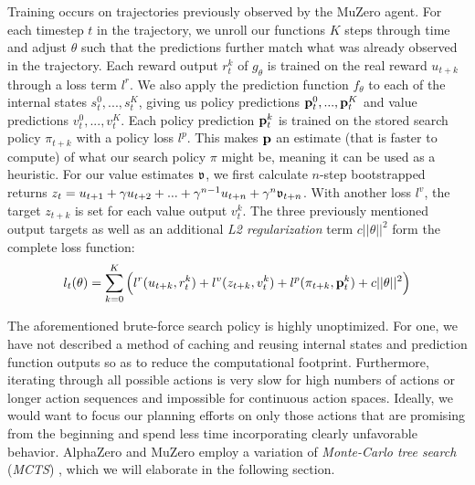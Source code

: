 Training occurs on trajectories previously observed by the MuZero agent. For each timestep $t$ in the trajectory, we unroll our functions $K$ steps through time and adjust $\theta$ such that the predictions further match what was already observed in the trajectory. Each reward output $r^k_t$ of $g_\theta$ is trained on the real reward $u_{t+k}$ through a loss term $l^r$. We also apply the prediction function $f_\theta$ to each of the internal states $s^0_t, ..., s^K_t$, giving us policy predictions $\text{\textbf{p}}^0_t, ..., \text{\textbf{p}}^K_t$ and value predictions $v^0_t, ..., v^K_t$. Each policy prediction $\text{\textbf{p}}^k_t$ is trained on the stored search policy $\pi_{t+k}$ with a policy loss $l^p$. This makes $\text{\textbf{p}}$ an estimate (that is faster to compute) of what our search policy $\pi$ might be, meaning it can be used as a heuristic. For our value estimates $\mathfrak{v}$, we first calculate $n$-step bootstrapped returns $z_t = u_{t+1} + \gamma u_{t+2} + ... + \gamma^{n-1} u_{t+n} + \gamma^n\mathfrak{v}_{t+n}$. With another loss $l^v$, the target $z_{t+k}$ is set for each value output $v^k_t$. The three previously mentioned output targets as well as an additional \textit{L2 regularization} \cite{l2-regularization} term $c||\theta||^2$ form the complete loss function:
\begin{equation*}
    l_t(\theta) = \sum^K_{k=0} \left(l^r(u_{t+k}, r_t^k) + l^v(z_{t+k}, v_t^k) + l^p(\pi_{t+k}, \text{\textbf{p}}_t^k) + c||\theta||^2\right)
\end{equation*}

The aforementioned brute-force search policy is highly unoptimized. For one, we have not described a method of caching and reusing internal states and prediction function outputs so as to reduce the computational footprint. Furthermore, iterating through all possible actions is very slow for high numbers of actions or longer action sequences and impossible for continuous action spaces. Ideally, we would want to focus our planning efforts on only those actions that are promising from the beginning and spend less time incorporating clearly unfavorable behavior. AlphaZero and MuZero employ a variation of \textit{Monte-Carlo tree search} (\textit{MCTS}) \cite{mcts}, which we will elaborate in the following section.

